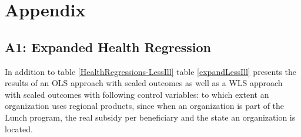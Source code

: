 \documentclass[12pt, a4paper, titlepage]{article}\usepackage[]{graphicx}\usepackage[]{color}
\begin{document}
\printbibliography

\section{Appendix}

\subsection{A1: Expanded Health Regression}

In addition to table \ref{HealthRegressions-LessIll} table \ref{expandLessIll} presents the results of an OLS approach with scaled outcomes as well as a WLS approach with scaled outcomes with following control variables: to which extent an organization uses regional products, since when an organization is part of the Lunch program, the real subsidy per beneficiary and the state an organization is located. 


% 
\end{document}
